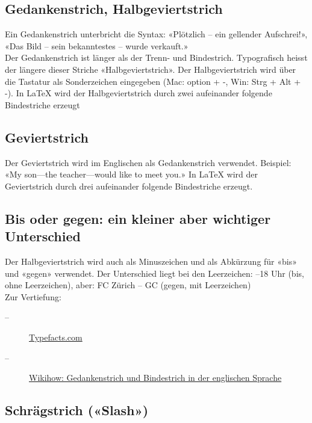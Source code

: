 \subsection{Gedankenstrich, Halbgeviertstrich} 

Ein Gedankenstrich unterbricht die Syntax: «Plötzlich -- ein gellender Aufschrei!», «Das Bild -- sein bekanntestes -- wurde verkauft.» \\

Der Gedankenstrich ist länger als der  Trenn- und Bindestrich. Typografisch heisst der längere dieser Striche «Halbgeviertstrich». Der Halbgeviertstrich wird über die Tastatur als Sonderzeichen eingegeben (Mac: option + -, Win: Strg + Alt + -). In LaTeX wird der Halbgeviertstrich durch zwei aufeinander folgende Bindestriche erzeugt

\subsection{Geviertstrich} 

Der Geviertstrich wird im Englischen als Gedankenstrich verwendet. Beispiel: «My son---the teacher---would like to meet you.» In LaTeX wird der Geviertstrich durch drei aufeinander folgende Bindestriche erzeugt.

\subsection{Bis oder gegen: ein kleiner aber wichtiger Unterschied}

Der Halbgeviertstrich wird auch als Minuszeichen und als Abkürzung für «bis» und «gegen» verwendet. Der Unterschied liegt bei den Leerzeichen: \hfill {}–18 Uhr (bis, ohne Leerzeichen), aber: FC Zürich – GC (gegen, mit Leerzeichen) \\

Zur Vertiefung: 
\begin{description}
  \item[--] \href{https://typefacts.com/artikel/binde-und-gedankenstrich}{Typefacts.com} 
  \item[--] \href{https://de.wikihow.com/Gedankenstrich-und-Bindestrich-in-der-englischen-Sprache}{Wikihow: Gedankenstrich und Bindestrich in der englischen Sprache}
\end{description}

\subsection{Schrägstrich («Slash»)}

